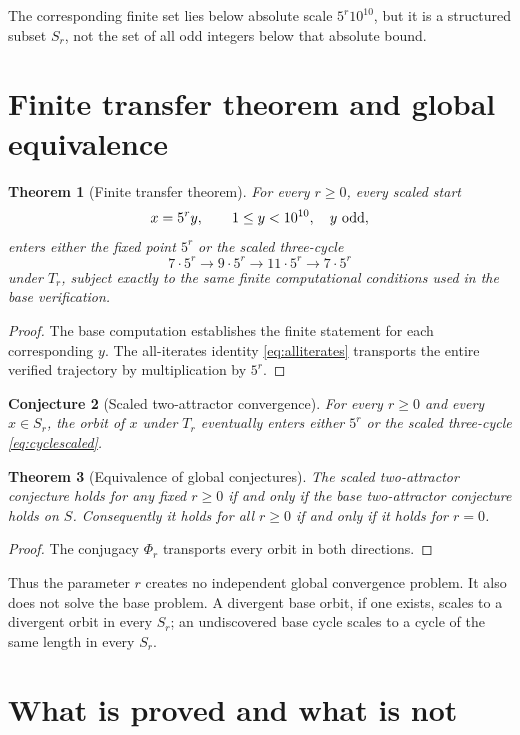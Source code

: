 \documentclass[11pt]{article}
\newtheorem{theorem}{Theorem}[section]
\newtheorem{conjecture}[theorem]{Conjecture}
\theoremstyle{remark}
\begin{document}
The corresponding finite set lies below absolute scale $5^r10^{10}$, but it is a structured subset $S_r$, not the set of all odd integers below that absolute bound.

\section{Finite transfer theorem and global equivalence}

\begin{theorem}[Finite transfer theorem]
For every $r\ge0$, every scaled start
\[
x=5^ry,\qquad 1\le y<10^{10},\quad y\ {\rm odd},
\]
enters either the fixed point $5^r$ or the scaled three-cycle
\[
7\cdot5^r\to9\cdot5^r\to11\cdot5^r\to7\cdot5^r
\]
under $T_r$, subject exactly to the same finite computational conditions used in the base verification.
\end{theorem}

\begin{proof}
The base computation establishes the finite statement for each corresponding $y$.  The all-iterates identity \eqref{eq:alliterates} transports the entire verified trajectory by multiplication by $5^r$.
\end{proof}

\begin{conjecture}[Scaled two-attractor convergence]
For every $r\ge0$ and every $x\in S_r$, the orbit of $x$ under $T_r$ eventually enters either $5^r$ or the scaled three-cycle \eqref{eq:cyclescaled}.
\end{conjecture}

\begin{theorem}[Equivalence of global conjectures]
The scaled two-attractor conjecture holds for any fixed $r\ge0$ if and only if the base two-attractor conjecture holds on $S$.  Consequently it holds for all $r\ge0$ if and only if it holds for $r=0$.
\end{theorem}

\begin{proof}
The conjugacy $\Phi_r$ transports every orbit in both directions.
\end{proof}

Thus the parameter $r$ creates no independent global convergence problem.  It also does not solve the base problem.  A divergent base orbit, if one exists, scales to a divergent orbit in every $S_r$; an undiscovered base cycle scales to a cycle of the same length in every $S_r$.

\section{What is proved and what is not}
\end{document}
